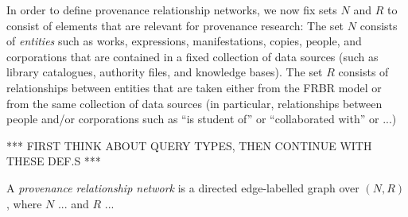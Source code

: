 In order to define provenance relationship networks, we now fix sets $N$ and $R$ to consist
of elements that are relevant for provenance research:
The set $N$ consists of \emph{entities} such as 
works, expressions, manifestations, copies, people, and corporations
that are contained in a fixed collection of data sources (such as library catalogues,
authority files, and knowledge bases). The set $R$ consists of relationships
between entities that are taken either from the FRBR model
or from the same collection of data sources (in particular, relationships between people and/or corporations
such as ``is student of'' or ``collaborated with'' or ...)

*** FIRST THINK ABOUT QUERY TYPES, THEN CONTINUE WITH THESE DEF.S ***


A \emph{provenance relationship network} is a directed edge-labelled graph over $(N,R)$,
where $N$ ... and $R$ ... 
